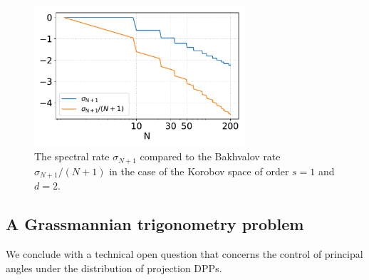 \documentclass[twoside,11pt]{book}
\numberwithin{theorem}{chapter}
\numberwithin{definition}{chapter}
\numberwithin{proposition}{chapter}
\numberwithin{corollary}{chapter}
\numberwithin{example}{chapter}
\numberwithin{lemma}{chapter}
\numberwithin{assumption}{chapter}
\numberwithin{equation}{chapter}
\numberwithin{figure}{chapter}
\begin{document}
\begin{figure}[h]
\centering
\includegraphics[width= 0.7\textwidth]{img/conclusion/Bakhvalov_for_Korobov_2D_s_1.pdf}
\caption{The spectral rate $\sigma_{N+1}$ compared to the Bakhvalov rate $\sigma_{N+1}/(N+1)$ in the case of the Korobov space of order $s=1$ and $d =2$. \label{fig:conclusion_bakhvalov_for_korobov}}
\end{figure}









 




\subsection{A Grassmannian trigonometry problem}\label{sec:conclusion_trigonometry_problem}
We conclude with a technical open question that concerns the control of principal angles under the distribution of projection DPPs.
\end{document}

